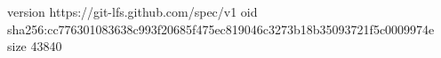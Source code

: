 version https://git-lfs.github.com/spec/v1
oid sha256:cc776301083638c993f20685f475ec819046c3273b18b35093721f5c0009974e
size 43840
